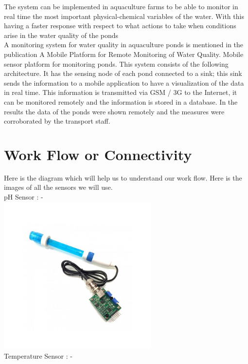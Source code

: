 The system can be implemented in aquaculture farms to be able to monitor in real time the most important physical-chemical variables of the water. With this having a faster response with respect to what actions to take when conditions arise in the water quality of the ponds\\

A monitoring system for water quality in aquaculture ponds is mentioned in the publication A Mobile Platform for Remote Monitoring of Water Quality. Mobile sensor platform for monitoring ponds. This system consists of the following architecture. It has the sensing node of each pond connected to a sink; this sink sends the information to a mobile application to have a visualization of the data in real time. This information is transmitted via GSM / 3G to the Internet, it can be monitored remotely and the information is stored in a database. In the results the data of the ponds were shown remotely and the measures were corroborated by the transport staff.\\


\section{Work Flow or Connectivity}

Here is the diagram which will help us to understand our work flow. Here is the images of all the sensors we will use.\\

pH Sensor : -\\

\includegraphics[width=0.6\textwidth]{images/ph sensor.jpg}\\

Temperature Sensor : -\\

